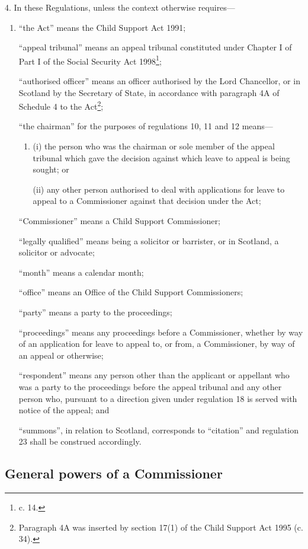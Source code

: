 \documentclass[12pt,a4paper]{article}
\begin{document}
4.  In these Regulations, unless the context otherwise requires---
\begin{enumerate}\item[]
“the Act” means the Child Support Act 1991;

“appeal tribunal” means an appeal tribunal constituted under Chapter I of Part I of the Social Security Act 1998\footnote{ c. 14.};

“authorised officer” means an officer authorised by the Lord Chancellor, or in Scotland by the Secretary of State, in accordance with paragraph 4A of Schedule 4 to the Act\footnote{\frenchspacing Paragraph 4A was inserted by section 17(1) of the Child Support Act 1995 (c. 34).};

“the chairman” for the purposes of regulations 10, 11 and 12 means---
\begin{enumerate}\item[]
(i)
the person who was the chairman or sole member of the appeal tribunal which gave the decision against which leave to appeal is being sought; or

(ii)
any other person authorised to deal with applications for leave to appeal to a Commissioner against that decision under the Act;
\end{enumerate}

“Commissioner” means a Child Support Commissioner;

“legally qualified” means being a solicitor or barrister, or in Scotland, a solicitor or advocate;

“month” means a calendar month;

“office” means an Office of the Child Support Commissioners;

“party” means a party to the proceedings;

“proceedings” means any proceedings before a Commissioner, whether by way of an application for leave to appeal to, or from, a Commissioner, by way of an appeal or otherwise;

“respondent” means any person other than the applicant or appellant who was a party to the proceedings before the appeal tribunal and any other person who, pursuant to a direction given under regulation 18 is served with notice of the appeal; and

“summons”, in relation to Scotland, corresponds to “citation” and regulation 23 shall be construed accordingly.
\end{enumerate}

\subsection[5. General powers of a Commissioner]{General powers of a Commissioner}
\end{document}

